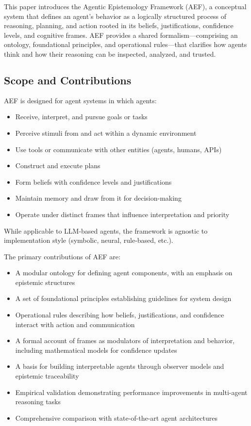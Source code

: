 \documentclass[10pt,a4paper]{article}
\begin{document}
This paper introduces the Agentic Epistemology Framework (AEF), a conceptual system that defines an agent's behavior as a logically structured process of reasoning, planning, and action rooted in its beliefs, justifications, confidence levels, and cognitive frames. AEF provides a shared formalism—comprising an ontology, foundational principles, and operational rules—that clarifies how agents think and how their reasoning can be inspected, analyzed, and trusted.

\subsection{Scope and Contributions}
AEF is designed for agent systems in which agents:
\begin{itemize}
\item Receive, interpret, and pursue goals or tasks
\item Perceive stimuli from and act within a dynamic environment
\item Use tools or communicate with other entities (agents, humans, APIs) \citep{agents_js}
\item Construct and execute plans
\item Form beliefs with confidence levels and justifications \citep{kahneman1979prospect, justification_models}
\item Maintain memory and draw from it for decision-making \citep{agents_js}
\item Operate under distinct frames that influence interpretation and priority \citep{lakoff1987women, minsky1974framework}
\end{itemize}
While applicable to LLM-based agents, the framework is agnostic to implementation style (symbolic, neural, rule-based, etc.).

The primary contributions of AEF are:
\begin{itemize}
\item A modular ontology for defining agent components, with an emphasis on epistemic structures
\item A set of foundational principles establishing guidelines for system design
\item Operational rules describing how beliefs, justifications, and confidence interact with action and communication
\item A formal account of frames as modulators of interpretation and behavior, including mathematical models for confidence updates
\item A basis for building interpretable agents through observer models and epistemic traceability
\item Empirical validation demonstrating performance improvements in multi-agent reasoning tasks
\item Comprehensive comparison with state-of-the-art agent architectures
\end{itemize}
\end{document}

